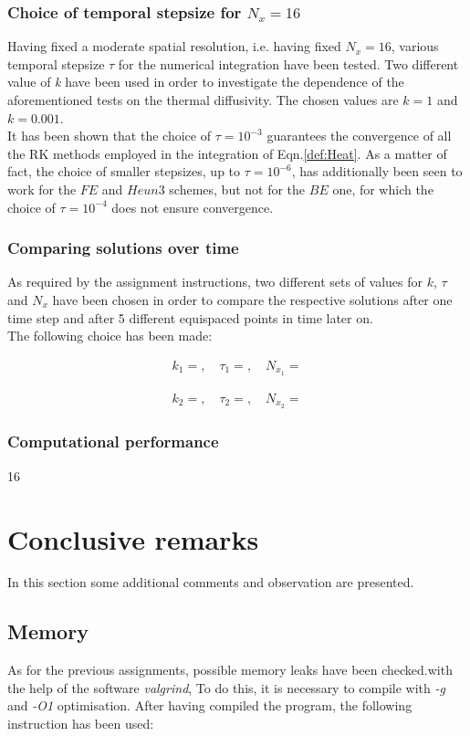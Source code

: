 \documentclass[11pt]{article}
\theoremstyle{theorem}
\theoremstyle{definition}
\begin{document}
\subsubsection{Choice of temporal stepsize for $N_x=16$}
Having fixed a moderate spatial resolution, i.e. having fixed $N_x=16$, various temporal stepsize $\tau$ for the numerical integration have been tested. Two different value of \emph{k} have been used in order to investigate the dependence of the aforementioned tests on the thermal diffusivity. The chosen values are $k=1$ and $k=0.001$.\\
It has been shown that the choice of $\tau=10^{-3}$ guarantees the convergence of all the RK methods employed in the integration of Eqn.\ref{def:Heat}. As a matter of fact, the choice of smaller stepsizes, up to $\tau=10^{-6}$, has additionally been seen to work for the $FE$ and $Heun3$ schemes, but not for the $BE$ one, for which the choice of $\tau=10^{-4}$ does not ensure convergence.\\ 

\subsubsection{Comparing solutions over time}
As required by the assignment instructions, two different sets of values for $k$, $\tau$ and $N_x$ have been chosen in order to compare the respective solutions after one time step and after 5 different equispaced points in time later on.\\
The following choice has been made:

\begin{align}
	\label{eqn:set-1}
	k_1=, \quad\tau_1=, \quad N_{x_1}=
\end{align}

\begin{align}
\label{eqn:set-2}
k_2=, \quad\tau_2=, \quad N_{x_2}=
\end{align} 

\subsubsection{Computational performance}
16 

\section{Conclusive remarks}
In this section some additional comments and observation are presented.

\subsection{Memory}
As for the previous assignments, possible memory leaks have been checked.with the help of the software \emph{valgrind}, To do this, it is necessary to compile with \emph{-g} and \emph{-O1} optimisation. After having compiled the program, the following instruction has been used:
\end{document}
